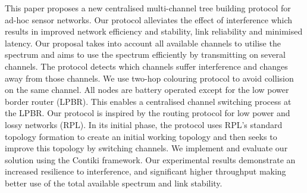 This paper proposes a new centralised multi-channel tree building protocol for ad-hoc sensor networks. Our protocol alleviates the effect of interference which results in improved network efficiency and stability, link reliability and minimised latency. 
        Our proposal takes into account all available channels to utilise the spectrum and aims to use the spectrum efficiently by transmitting on several channels. The protocol detects which channels suffer interference and changes away from those channels. We use two-hop colouring protocol to avoid collision on the same channel. 
        All nodes are battery operated except for the low power border router (LPBR). This enables a centralised channel switching process at the LPBR. Our protocol is inspired by the routing protocol for low power and lossy networks (RPL). In its initial phase, the protocol uses RPL's standard topology formation to create an initial working topology and then seeks to improve this topology by switching channels.
        We implement and evaluate our solution using the Contiki framework. Our experimental results demonstrate an increased resilience to interference, and significant higher throughput making better use of the total available spectrum and link stability. 








